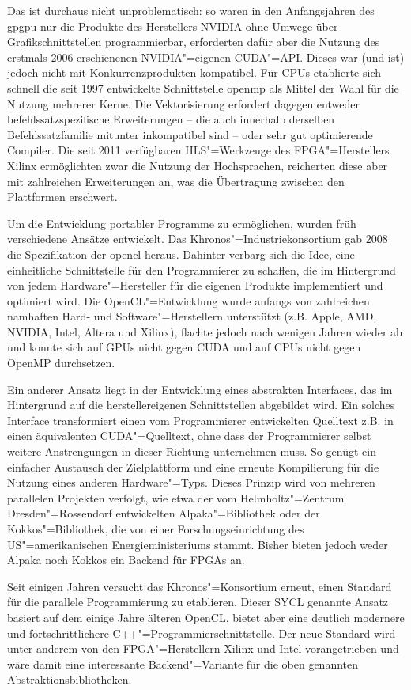 Das ist durchaus nicht unproblematisch: so waren in den Anfangsjahren des
\gls{gpgpu} nur die Produkte des Herstellers NVIDIA ohne Umwege über
Grafikschnittstellen programmierbar, erforderten dafür aber die Nutzung des
erstmals 2006 erschienenen NVIDIA"=eigenen CUDA"=API. Dieses war (und ist)
jedoch nicht mit Konkurrenzprodukten kompatibel. Für CPUs etablierte sich
schnell die seit 1997 entwickelte Schnittstelle \gls{openmp} als Mittel der Wahl
für die Nutzung mehrerer Kerne. Die Vektorisierung erfordert dagegen entweder
befehlssatzspezifische Erweiterungen -- die auch innerhalb derselben
Befehlssatzfamilie mitunter inkompatibel sind -- oder sehr gut optimierende
Compiler. Die seit 2011 verfügbaren HLS"=Werkzeuge des FPGA"=Herstellers Xilinx
ermöglichten zwar die Nutzung der Hochsprachen, reicherten diese aber mit
zahlreichen Erweiterungen an, was die Übertragung zwischen den Plattformen
erschwert.

Um die Entwicklung portabler Programme zu ermöglichen, wurden früh verschiedene
Ansätze entwickelt. Das Khronos"=Industriekonsortium gab 2008 die Spezifikation
der \gls{opencl} heraus. Dahinter verbarg sich die Idee, eine einheitliche
Schnittstelle für den Programmierer zu schaffen, die im Hintergrund von
jedem Hardware"=Hersteller für die eigenen Produkte implementiert und optimiert
wird. Die OpenCL"=Entwicklung wurde anfangs von zahlreichen namhaften Hard- und
Software"=Herstellern unterstützt (z.B. Apple, AMD, NVIDIA, Intel, Altera und
Xilinx), flachte jedoch nach wenigen Jahren wieder ab und konnte sich auf GPUs
nicht gegen CUDA und auf CPUs nicht gegen OpenMP durchsetzen.

Ein anderer Ansatz liegt in der Entwicklung eines abstrakten Interfaces, das im
Hintergrund auf die herstellereigenen Schnittstellen abgebildet wird. Ein
solches Interface transformiert einen vom Programmierer entwickelten Quelltext
z.B. in einen äquivalenten CUDA"=Quelltext, ohne dass der Programmierer selbst
weitere Anstrengungen in dieser Richtung unternehmen muss. So genügt ein
einfacher Austausch der Zielplattform und eine erneute Kompilierung für die
Nutzung eines anderen Hardware"=Typs. Dieses Prinzip wird von mehreren
parallelen Projekten verfolgt, wie etwa der vom Helmholtz"=Zentrum
Dresden"=Rossendorf entwickelten Alpaka"=Bibliothek oder der Kokkos"=Bibliothek,
die von einer Forschungseinrichtung des US"=amerikanischen Energieministeriums
stammt. Bisher bieten jedoch weder Alpaka noch Kokkos ein Backend für FPGAs an.

Seit einigen Jahren versucht das Khronos"=Konsortium erneut, einen Standard für
die parallele Programmierung zu etablieren. Dieser SYCL genannte Ansatz basiert
auf dem einige Jahre älteren OpenCL, bietet aber eine deutlich modernere und
fortschrittlichere C++"=Programmierschnittstelle. Der neue Standard wird unter
anderem von den FPGA"=Herstellern Xilinx und Intel vorangetrieben und wäre damit
eine interessante Backend"=Variante für die oben genannten
Abstraktionsbibliotheken.

